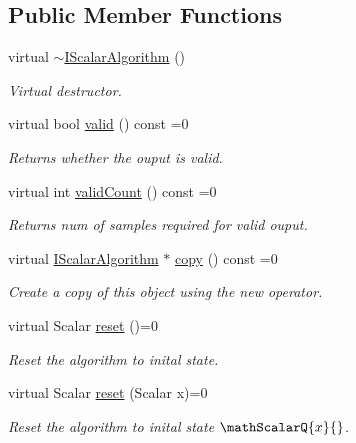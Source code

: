\subsection*{Public Member Functions}
\begin{DoxyCompactItemize}
\item 
virtual \hyperlink{classow__core_1_1IScalarAlgorithm_a565bd8e9b4c48e4b72bbf11ae6e5bc27}{$\sim$\+I\+Scalar\+Algorithm} ()\hypertarget{classow__core_1_1IScalarAlgorithm_a565bd8e9b4c48e4b72bbf11ae6e5bc27}{}\label{classow__core_1_1IScalarAlgorithm_a565bd8e9b4c48e4b72bbf11ae6e5bc27}

\begin{DoxyCompactList}\small\item\em Virtual destructor. \end{DoxyCompactList}\item 
virtual bool \hyperlink{classow__core_1_1IScalarAlgorithm_a5a7472cb68436e67fc8cb287b477fca6}{valid} () const =0
\begin{DoxyCompactList}\small\item\em Returns whether the ouput is valid. \end{DoxyCompactList}\item 
virtual int \hyperlink{classow__core_1_1IScalarAlgorithm_ac57f739093a012beec0867797a02802a}{valid\+Count} () const =0
\begin{DoxyCompactList}\small\item\em Returns num of samples required for valid ouput. \end{DoxyCompactList}\item 
virtual \hyperlink{classow__core_1_1IScalarAlgorithm}{I\+Scalar\+Algorithm} $\ast$ \hyperlink{classow__core_1_1IScalarAlgorithm_a40025ea4310f3f3e88bc9ae63de432fc}{copy} () const =0
\begin{DoxyCompactList}\small\item\em Create a copy of this object using the new operator. \end{DoxyCompactList}\item 
virtual Scalar \hyperlink{classow__core_1_1IScalarAlgorithm_afd0c0837663cff664922c7a116349b46}{reset} ()=0
\begin{DoxyCompactList}\small\item\em Reset the algorithm to inital state. \end{DoxyCompactList}\item 
virtual Scalar \hyperlink{classow__core_1_1IScalarAlgorithm_a20cbd10a8b2ec4d10a48b6605f010f17}{reset} (Scalar x)=0
\begin{DoxyCompactList}\small\item\em Reset the algorithm to inital state $\mathScalarQ{x}{}$. \end{DoxyCompactList}\item 

\end{DoxyCompactItemize}
